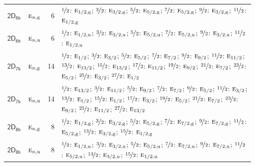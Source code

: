 \documentclass[10pt,a4paper]{article}
\numberwithin{equation}{section}
\newcommand{\grp}[1]{\mathsf{#1}}
\newcommand{\irr}[1]{\text{\normalfont\scshape #1}}
\newcommand{\ptag}[1]{\mathrm{#1}}
\newlength{\fillwidth}\newlength{\cellwidth}\newlength{\colwidth}
\begin{document}
{\begin{longtable}{@{}llr>{\RaggedRight\arraybackslash}p{\fillwidth}@{}}
\href{2D6h.pdf}{$\grp{2D_{6h}}$} & $\irr{e}_{n,\ptag{g}}$ & 6 & $\nicefrac{1}{2}$: $\irr{e}_{1/2,\ptag{g}}$; $\nicefrac{3}{2}$: $\irr{e}_{3/2,\ptag{g}}$; $\nicefrac{5}{2}$: $\irr{e}_{5/2,\ptag{g}}$; $\nicefrac{7}{2}$: $\irr{e}_{5/2,\ptag{g}}$; $\nicefrac{9}{2}$: $\irr{e}_{3/2,\ptag{g}}$; $\nicefrac{11}{2}$: $\irr{e}_{1/2,\ptag{g}}$\\
\href{2D6h.pdf}{$\grp{2D_{6h}}$} & $\irr{e}_{n,\ptag{u}}$ & 6 & $\nicefrac{1}{2}$: $\irr{e}_{1/2,\ptag{u}}$; $\nicefrac{3}{2}$: $\irr{e}_{3/2,\ptag{u}}$; $\nicefrac{5}{2}$: $\irr{e}_{5/2,\ptag{u}}$; $\nicefrac{7}{2}$: $\irr{e}_{5/2,\ptag{u}}$; $\nicefrac{9}{2}$: $\irr{e}_{3/2,\ptag{u}}$; $\nicefrac{11}{2}$: $\irr{e}_{1/2,\ptag{u}}$\\
\href{2D7h.pdf}{$\grp{2D_{7h}}$} & $\irr{e}_{n,\ptag{g}}$ & 14 & $\nicefrac{1}{2}$: $\irr{e}_{1/2}$; $\nicefrac{3}{2}$: $\irr{e}_{3/2}$; $\nicefrac{5}{2}$: $\irr{e}_{5/2}$; $\nicefrac{7}{2}$: $\irr{e}_{7/2}$; $\nicefrac{9}{2}$: $\irr{e}_{9/2}$; $\nicefrac{11}{2}$: $\irr{e}_{11/2}$; $\nicefrac{13}{2}$: $\irr{e}_{13/2}$; $\nicefrac{15}{2}$: $\irr{e}_{13/2}$; $\nicefrac{17}{2}$: $\irr{e}_{11/2}$; $\nicefrac{19}{2}$: $\irr{e}_{9/2}$; $\nicefrac{21}{2}$: $\irr{e}_{7/2}$; $\nicefrac{23}{2}$: $\irr{e}_{5/2}$; $\nicefrac{25}{2}$: $\irr{e}_{3/2}$; $\nicefrac{27}{2}$: $\irr{e}_{1/2}$\\
\href{2D7h.pdf}{$\grp{2D_{7h}}$} & $\irr{e}_{n,\ptag{u}}$ & 14 & $\nicefrac{1}{2}$: $\irr{e}_{13/2}$; $\nicefrac{3}{2}$: $\irr{e}_{11/2}$; $\nicefrac{5}{2}$: $\irr{e}_{9/2}$; $\nicefrac{7}{2}$: $\irr{e}_{7/2}$; $\nicefrac{9}{2}$: $\irr{e}_{5/2}$; $\nicefrac{11}{2}$: $\irr{e}_{3/2}$; $\nicefrac{13}{2}$: $\irr{e}_{1/2}$; $\nicefrac{15}{2}$: $\irr{e}_{1/2}$; $\nicefrac{17}{2}$: $\irr{e}_{3/2}$; $\nicefrac{19}{2}$: $\irr{e}_{5/2}$; $\nicefrac{21}{2}$: $\irr{e}_{7/2}$; $\nicefrac{23}{2}$: $\irr{e}_{9/2}$; $\nicefrac{25}{2}$: $\irr{e}_{11/2}$; $\nicefrac{27}{2}$: $\irr{e}_{13/2}$\\
\href{2D8h.pdf}{$\grp{2D_{8h}}$} & $\irr{e}_{n,\ptag{g}}$ & 8 & $\nicefrac{1}{2}$: $\irr{e}_{1/2,\ptag{g}}$; $\nicefrac{3}{2}$: $\irr{e}_{3/2,\ptag{g}}$; $\nicefrac{5}{2}$: $\irr{e}_{5/2,\ptag{g}}$; $\nicefrac{7}{2}$: $\irr{e}_{7/2,\ptag{g}}$; $\nicefrac{9}{2}$: $\irr{e}_{7/2,\ptag{g}}$; $\nicefrac{11}{2}$: $\irr{e}_{5/2,\ptag{g}}$; $\nicefrac{13}{2}$: $\irr{e}_{3/2,\ptag{g}}$; $\nicefrac{15}{2}$: $\irr{e}_{1/2,\ptag{g}}$\\
\href{2D8h.pdf}{$\grp{2D_{8h}}$} & $\irr{e}_{n,\ptag{u}}$ & 8 & $\nicefrac{1}{2}$: $\irr{e}_{1/2,\ptag{u}}$; $\nicefrac{3}{2}$: $\irr{e}_{3/2,\ptag{u}}$; $\nicefrac{5}{2}$: $\irr{e}_{5/2,\ptag{u}}$; $\nicefrac{7}{2}$: $\irr{e}_{7/2,\ptag{u}}$; $\nicefrac{9}{2}$: $\irr{e}_{7/2,\ptag{u}}$; $\nicefrac{11}{2}$: $\irr{e}_{5/2,\ptag{u}}$; $\nicefrac{13}{2}$: $\irr{e}_{3/2,\ptag{u}}$; $\nicefrac{15}{2}$: $\irr{e}_{1/2,\ptag{u}}$\\

\end{longtable}}
\end{document}
